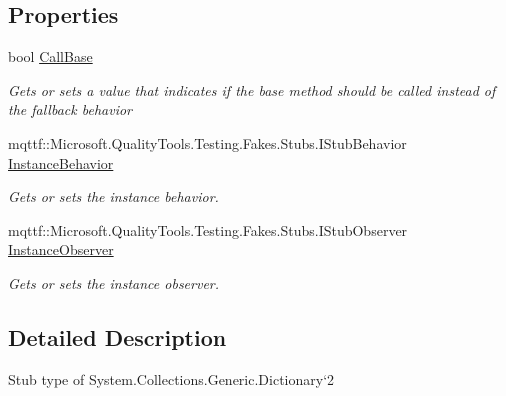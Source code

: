 \subsection*{Properties}
\begin{DoxyCompactItemize}
\item 
bool \hyperlink{class_system_1_1_collections_1_1_generic_1_1_fakes_1_1_stub_dictionary_3_01_t_key_00_01_t_value_01_4_a16e1beee895a64a1ae1dc217269d83c8}{Call\-Base}
\begin{DoxyCompactList}\small\item\em Gets or sets a value that indicates if the base method should be called instead of the fallback behavior\end{DoxyCompactList}\item 
mqttf\-::\-Microsoft.\-Quality\-Tools.\-Testing.\-Fakes.\-Stubs.\-I\-Stub\-Behavior \hyperlink{class_system_1_1_collections_1_1_generic_1_1_fakes_1_1_stub_dictionary_3_01_t_key_00_01_t_value_01_4_a4a7d94749f51dbd66e00f479cd9ce081}{Instance\-Behavior}
\begin{DoxyCompactList}\small\item\em Gets or sets the instance behavior.\end{DoxyCompactList}\item 
mqttf\-::\-Microsoft.\-Quality\-Tools.\-Testing.\-Fakes.\-Stubs.\-I\-Stub\-Observer \hyperlink{class_system_1_1_collections_1_1_generic_1_1_fakes_1_1_stub_dictionary_3_01_t_key_00_01_t_value_01_4_a7491938172ec15ca26bf3cec72a013f9}{Instance\-Observer}
\begin{DoxyCompactList}\small\item\em Gets or sets the instance observer.\end{DoxyCompactList}\end{DoxyCompactItemize}


\subsection{Detailed Description}
Stub type of System.\-Collections.\-Generic.\-Dictionary`2



